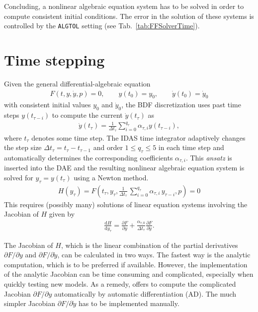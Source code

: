 Concluding, a nonlinear algebraic equation system has to be solved in order to compute consistent initial conditions.
The error in the solution of these systems is controlled by the \texttt{ALGTOL} setting (see Tab.~\ref{tab:FFSolverTime}).

\section{Time stepping}\label{sec:SimTimeIntegration}

Given the general differential-algebraic equation
\begin{align*}
	F(t, y, \dot{y}, p) = 0, \qquad y\left(t_0 \right) = y_0, \qquad \dot{y}\left(t_0 \right) = \dot{y}_0
\end{align*}
with consistent initial values $y_0$ and $\dot{y}_0$, the BDF discretization uses past time steps $y\left( t_{\tau - i} \right)$ to compute the current $\dot{y}\left(t_\tau\right)$ as
\begin{align*}
	\dot{y}\left(t_\tau\right) = \frac{1}{\Delta t_\tau} \sum_{i=0}^{q_{\tau}} \alpha_{\tau,i} y\left(t_{\tau-i}\right),
\end{align*}
where $t_\tau$ denotes some time step. 
The IDAS time integrator adaptively changes the step size ${\Delta t_\tau = t_\tau-t_{\tau-1}}$ and order $1 \le q_{\tau} \le 5$ in each time step and automatically determines the corresponding coefficients $\alpha_{\tau,i}$.
This \textit{ansatz} is inserted into the DAE and the resulting nonlinear algebraic equation system is solved for $y_{\tau} = y\left( t_\tau \right)$ using a Newton method.
\begin{align}
	H(y_\tau) = F\left(t_\tau,y_\tau,\frac{1}{\Delta t_\tau} \,\sum_{i=0}^{q_\tau}{\alpha_{\tau,i} \, y_{\tau-i}}, p\right) = 0 \label{eq:BDFNonlinSystem}
\end{align}
This requires (possibly many) solutions of linear equation systems involving the Jacobian of $H$ given by
\begin{align*}
	\frac{\mathrm{d}H}{\mathrm{d}y_\tau} = \frac{\partial F}{\partial y} + \frac{\alpha_{\tau,0}}{\Delta t_\tau} \frac{\partial F}{\partial \dot{y}}.
\end{align*}

The Jacobian of $H$, which is the linear combination of the partial derivatives $\partial F / \partial y$ and $\partial F / \partial \dot{y}$, can be calculated in two ways.
The fastest way is the analytic computation, which is to be preferred if available.
However, the implementation of the analytic Jacobian can be time consuming and complicated, especially when quickly testing new models.
As a remedy, \CADET{} offers to compute the complicated Jacobian $\partial F / \partial y$ automatically by automatic differentiation (AD).
The much simpler Jacobian $\partial F / \partial \dot{y}$ has to be implemented manually.

